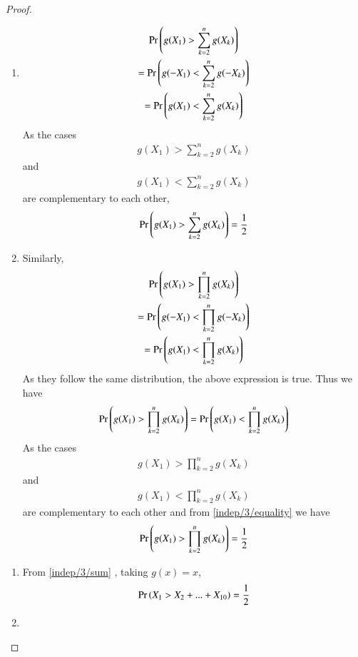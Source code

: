 \begin{proof}
\begin{enumerate}
\item 
\begin{multline}
    \Pr\left(g(X_1)>\sum_{k=2}^ng(X_k)\right)\\=
    \Pr\left(g(-X_1)<\sum_{k=2}^ng(-X_k)\right)\\=
    \Pr\left(g(X_1)<\sum_{k=2}^ng(X_k)\right)
\end{multline}
%
As the cases
\begin{align}
    g(X_1)>\sum_{k=2}^ng(X_k)
\end{align}
and
\begin{align}
    {g(X_1)<\sum_{k=2}^ng(X_k)}
\end{align}
are complementary to each other, 
\begin{align}\label{indep/3/sum}
 \Pr\left(g(X_1)>\sum_{k=2}^ng(X_k)\right)=\frac{1}{2}    
\end{align}
%
\item Similarly, 
\begin{multline}
    \Pr\left(g(X_1)>\prod_{k=2}^ng(X_k)\right)\\=
    \Pr\left(g(-X_1)<\prod_{k=2}^ng(-X_k)\right)\\=
    \Pr\left(g(X_1)<\prod_{k=2}^ng(X_k)\right)
\end{multline}
As they follow the same distribution, the above expression is true. Thus we have
\begin{align}
    \Pr\left(g(X_1)>\prod_{k=2}^ng(X_k)\right)=
    \Pr\left(g(X_1)<\prod_{k=2}^ng(X_k)\right)
\end{align}
%
As the cases
\begin{align}
    g(X_1)>\prod_{k=2}^ng(X_k)
\end{align}
and
\begin{align}
    {g(X_1)<\prod_{k=2}^ng(X_k)}
\end{align}
are complementary to each other and from 
 \eqref{indep/3/equality} we have
\begin{align}\label{indep/3/prod}
 \Pr\left(g(X_1)>\prod_{k=2}^ng(X_k)\right)=\frac{1}{2}    
\end{align}
\end{enumerate}
\begin{enumerate}[label = (\Alph*)]
    \item 
    From \eqref{indep/3/sum} , taking $g(x)=x$,
    \begin{align}
        \Pr\left(X_1>X_2+...+X_{10}\right)=\frac{1}{2}
    \end{align}
\item

\end{enumerate}
\end{proof}
